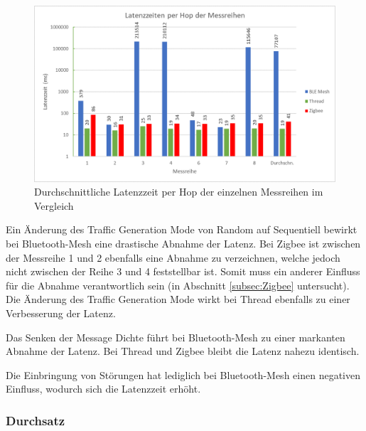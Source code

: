 \begin{figure}[h]
	\centering
	\includegraphics[width=1.0\textwidth]{graphics/Latenzzeiten_per_Hop_Messreihen.png}
	\caption{Durchschnittliche Latenzzeit per Hop der einzelnen Messreihen im Vergleich}\label{fig:Latenzzeiten_per_Hop_Messreihen}
\end{figure}

Ein Änderung des Traffic Generation Mode von Random auf Sequentiell bewirkt bei Bluetooth-Mesh eine drastische Abnahme der Latenz. Bei Zigbee ist zwischen der Messreihe 1 und 2 ebenfalls eine Abnahme zu verzeichnen, welche jedoch nicht zwischen der Reihe 3 und 4 feststellbar ist. Somit muss ein anderer Einfluss für die Abnahme verantwortlich sein (in Abschnitt \ref{subsec:Zigbee} untersucht). Die Änderung des Traffic Generation Mode wirkt bei Thread ebenfalls zu einer Verbesserung der Latenz.

Das Senken der Message Dichte führt bei Bluetooth-Mesh zu einer markanten Abnahme der Latenz. Bei Thread und Zigbee bleibt die Latenz nahezu identisch.

Die Einbringung von Störungen hat lediglich bei Bluetooth-Mesh einen negativen Einfluss, wodurch sich die Latenzzeit erhöht. 

\subsubsection{Durchsatz}\label{subsec:VergleichDurchsatzMessreihen}


